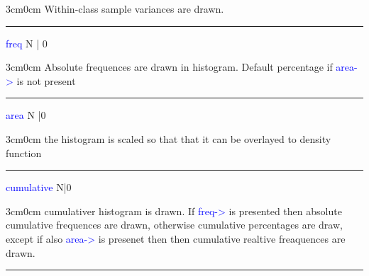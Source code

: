 \begin{changemargin}{3cm}{0cm} 
\noindent Within-class sample variances are drawn. 
\end{changemargin} 
\vspace{0.3cm} 
\hrule 
\vspace{0.3cm} 
\noindent \textcolor{blue}{freq}  \tabto{3cm}  N | 0  \tabto{5cm}     \tabto{7cm} 
\begin{changemargin}{3cm}{0cm} 
\noindent  Absolute  frequences are drawn in histogram. Default 
percentage if \textcolor{blue}{area->} is not present 
\end{changemargin} 
\vspace{0.3cm} 
\hrule 
\vspace{0.3cm} 
\noindent \textcolor{blue}{area}  \tabto{3cm}  N |0  \tabto{5cm}    \tabto{7cm} 
\begin{changemargin}{3cm}{0cm} 
\noindent the histogram is scaled so that that it can be overlayed to density function 
\end{changemargin} 
\vspace{0.3cm} 
\hrule 
\vspace{0.3cm} 
\noindent \textcolor{blue}{cumulative}  \tabto{3cm} N|0  \tabto{5cm}    \tabto{7cm} 
\begin{changemargin}{3cm}{0cm} 
\noindent  cumulativer histogram is drawn. If \textcolor{blue}{freq->} is presented then absolute 
cumulative frequences are drawn, otherwise cumulative percentages are draw, except if also \textcolor{blue}{area->} 
is presenet then then cumulative realtive freaquences are drawn. 
\end {changemargin} 
\hrule 
\vspace{0.2cm} 
\singlespacing 
